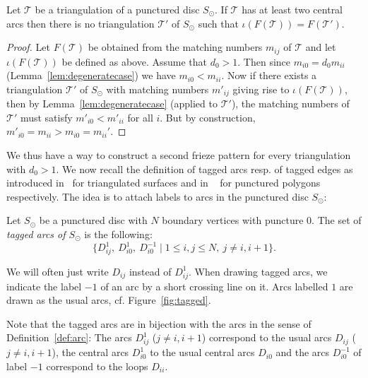 \documentclass[a4paper]{amsart}
\begin{document}
\begin{remark}
Let ${\mathcal T}$ be a triangulation of a punctured disc $S_{\odot}$. 
If ${\mathcal T}$ has at least two central arcs then there is 
no triangulation ${\mathcal T}'$ of $S_{\odot}$ such that $\iota (F({\mathcal T}))=F({\mathcal T}')$. 
\end{remark}

\begin{proof}
Let $F({\mathcal T})$ be obtained from the matching numbers $m_{ij}$ 
of ${\mathcal T}$ and let $\iota (F({\mathcal T}))$ be defined as above. 
Assume that $d_0>1$. Then since $m_{i0}=d_0m_{ii}$ 
(Lemma~\ref{lem:degeneratecase}) we have 
$m_{i0}<m_{ii}$. Now 
if there exists a triangulation ${\mathcal T}'$ of $S_{\odot}$ 
with matching numbers 
$m'_{ij}$ giving rise to $\iota (F({\mathcal T}))$, then by 
Lemma~\ref{lem:degeneratecase} (applied to 
${\mathcal T}'$), the matching numbers of ${\mathcal T}'$ must 
satisfy $m'_{i0}<m'_{ii}$ for all $i$. 
But by construction, $m'_{i0}=m_{ii}>m_{i0}=m_{ii}'$. 
\end{proof} 

We thus have a way to construct a second frieze pattern for 
every triangulation with $d_0>1$. 
We now recall the definition of tagged arcs resp. of tagged 
edges as introduced in~\cite[Definition 7.1]{fst06} for triangulated 
surfaces and in ~\cite[Section 2.1]{schiffler06} for punctured polygons 
respectively. The idea is to attach labels to arcs in the punctured 
disc $S_{\odot}$: 

\begin{definition} \label{def:taggedarcs}
Let $S_{\odot}$ be a punctured disc with $N$ boundary vertices 
with puncture $0$. The set of {\em tagged arcs of $S_{\odot}$} 
is the following: 
\[
\{ D_{ij}^1,\ D_{i0}^1,\ D_{i0}^{-1} \mid 1\le i,j\le N,\ j\neq i,i+1 \}.
\]
\end{definition}
We will often just write $D_{ij}$ instead of $D_{ij}^1$. 
When drawing tagged arcs, we indicate the label $-1$ of an arc by a short crossing 
line on it. Arcs labelled $1$ are drawn as the usual arcs, cf. Figure~\ref{fig:tagged}. 

\begin{remark}\label{rem:arcbijection}
Note that the tagged arcs are in bijection with the arcs in the sense of 
Definition~\ref{def:arc}: 
The arcs $D_{ij}^1$ ($j\neq i,i+1$) correspond to the usual arcs $D_{ij}$ ($j\neq i,i+1$), 
the central arcs $D_{i0}^1$ to the usual central arcs $D_{i0}$ and the 
arcs $D_{i0}^{-1}$ of label $-1$ correspond to the loops $D_{ii}$. 
\end{remark}
\end{document}
